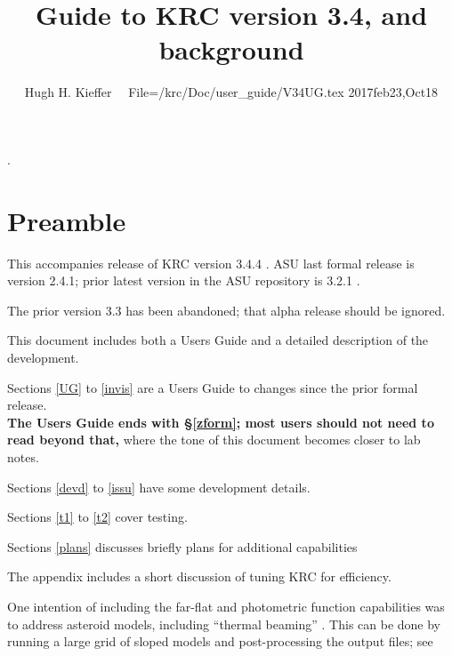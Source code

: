 \documentclass{article}
\title{Guide to KRC version 3.4, and background }
\author{Hugh H. Kieffer  \ \ File=/krc/Doc/user\_guide/V34UG.tex  2017feb23,Oct18}
\begin{document}
\maketitle
\tableofcontents
\listoffigures
\hrulefill .\hrulefill

\section{Preamble}
This accompanies release of KRC version 3.4.4 . ASU last formal
release is version 2.4.1; prior latest version in the ASU repository is 3.2.1 .

The prior version 3.3 has been abandoned; that alpha release should be ignored.

This document includes both a Users Guide and a detailed description of the development.

Sections \ref{UG} to \ref{invis} are a Users Guide to changes since the prior formal release.
\\ \textbf{ The Users Guide ends with  \S \ref{zform}; most users should not need to read beyond that,} where the tone of this document becomes closer to lab notes.  

Sections \ref{devd} to \ref{issu} have some development details.
 
Sections \ref{t1} to \ref{t2} cover testing.

Sections \ref{plans} discusses briefly plans for additional capabilities

The appendix includes a short discussion of tuning KRC for efficiency. 

One intention of including the far-flat and photometric function capabilities was
to address asteroid models, including ``thermal beaming'' . This can be done by
running a large grid of sloped models and post-processing the output files; see
 
\end{document}
